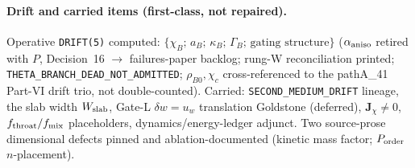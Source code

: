 \paragraph{Drift and carried items (first-class, not repaired).}
Operative \texttt{DRIFT(5)} computed:
\(\{\chi_B;\,a_B;\,\kappa_B;\,\Gamma_B;\,\text{gating structure}\}\) (\(\alpha_{\rm aniso}\)
retired with \(P\), Decision~16 \(\to\) failures-paper backlog; rung-W reconciliation printed;
\texttt{THETA\_BRANCH\_DEAD\_NOT\_ADMITTED}; \(\rho_{B0},\chi_c\) cross-referenced
to the pathA\_41 Part-VI drift trio, not double-counted). Carried:
\texttt{SECOND\_MEDIUM\_DRIFT} lineage, the slab width \(W_{\rm slab}\), Gate-L
\(\delta w=u_w\) translation Goldstone (deferred), \(\mathbf J_\chi\neq0\),
\(f_{\rm throat}/f_{\rm mix}\) placeholders, dynamics/energy-ledger adjunct.
Two source-prose dimensional defects pinned and ablation-documented (kinetic
mass factor; \(P_{\rm order}\) \(n\)-placement).

